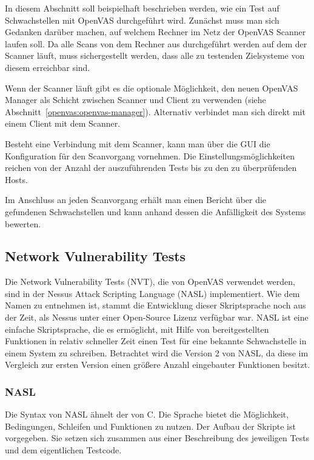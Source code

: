 In diesem Abschnitt soll beispielhaft beschrieben werden, wie ein Test auf 
Schwachstellen mit OpenVAS durchgeführt wird. Zunächst muss man sich Gedanken 
darüber machen, auf welchem Rechner im Netz der OpenVAS Scanner laufen soll. 
Da alle Scans von dem Rechner aus durchgeführt werden auf dem der Scanner läuft, 
muss sichergestellt werden, dass alle zu testenden Zielsysteme von diesem 
erreichbar sind. \cite[S. 13]{openvas-kompendium}

Wenn der Scanner läuft gibt es die optionale Möglichkeit, den neuen OpenVAS Manager 
als Schicht zwischen Scanner und Client zu verwenden 
(siehe Abschnitt~\ref{openvas:openvas-manager}). Alternativ verbindet man sich direkt 
mit einem Client mit dem Scanner.

Besteht eine Verbindung mit dem Scanner, kann man über die GUI die Konfiguration für 
den Scanvorgang vornehmen. Die Einstellungsmöglichkeiten reichen von der Anzahl der 
auszuführenden Tests bis zu den zu überprüfenden Hosts.

Im Anschluss an jeden Scanvorgang erhält man einen Bericht über die gefundenen 
Schwachstellen und kann anhand dessen die Anfälligkeit des Systems bewerten.    

\subsection{Network Vulnerability Tests}

Die Network Vulnerability Tests (NVT), die von OpenVAS verwendet werden, sind in der Nessus 
Attack Scripting Language (NASL) implementiert. Wie dem Namen zu entnehmen ist, stammt 
die Entwicklung dieser Skriptsprache noch aus der Zeit, als Nessus unter einer Open-Source 
Lizenz verfügbar war. NASL ist eine einfache Skriptsprache, die es ermöglicht, mit Hilfe 
von bereitgestellten Funktionen in relativ schneller Zeit einen Test für eine bekannte 
Schwachstelle in einem System zu schreiben. Betrachtet wird die Version 2 von NASL, da 
diese im Vergleich zur ersten Version einen größere Anzahl eingebauter Funktionen besitzt.
\cite[S. 3]{openvas-nasl-reference} 

\subsubsection{NASL}

Die Syntax von NASL ähnelt der von C. Die Sprache bietet die Möglichkeit, 
Bedingungen, Schleifen und Funktionen zu nutzen. Der Aufbau der Skripte ist 
vorgegeben. Sie setzen sich zusammen aus einer Beschreibung des jeweiligen 
Tests und dem eigentlichen Testcode. \cite[S.26]{openvas-nasl-guide}

